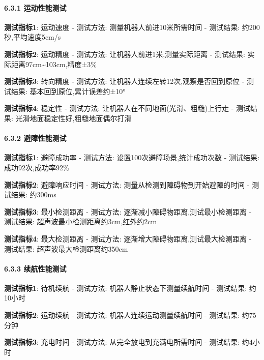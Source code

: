 \documentclass[
]{article}
\begin{document}
\hypertarget{ux8fd0ux52a8ux6027ux80fdux6d4bux8bd5}{%
\paragraph{6.3.1
运动性能测试}\label{ux8fd0ux52a8ux6027ux80fdux6d4bux8bd5}}

\textbf{测试指标1}: 运动速度 - 测试方法: 测量机器人前进10米所需时间 -
测试结果: 约200秒,平均速度5cm/s

\textbf{测试指标2}: 运动精度 - 测试方法: 让机器人前进1米,测量实际距离 -
测试结果: 实际距离97cm\textasciitilde103cm,精度±3\%

\textbf{测试指标3}: 转向精度 - 测试方法:
让机器人连续左转12次,观察是否回到原位 - 测试结果:
基本回到原位,累计误差约±10°

\textbf{测试指标4}: 稳定性 - 测试方法:
让机器人在不同地面(光滑、粗糙)上行走 - 测试结果:
光滑地面稳定性好,粗糙地面偶尔打滑

\hypertarget{ux907fux969cux6027ux80fdux6d4bux8bd5}{%
\paragraph{6.3.2
避障性能测试}\label{ux907fux969cux6027ux80fdux6d4bux8bd5}}

\textbf{测试指标1}: 避障成功率 - 测试方法:
设置100次避障场景,统计成功次数 - 测试结果: 成功92次,成功率92\%

\textbf{测试指标2}: 避障响应时间 - 测试方法:
测量从检测到障碍物到开始避障的时间 - 测试结果: 约300ms

\textbf{测试指标3}: 最小检测距离 - 测试方法:
逐渐减小障碍物距离,测试最小检测距离 - 测试结果:
超声波最小检测距离约3cm,红外约2cm

\textbf{测试指标4}: 最大检测距离 - 测试方法:
逐渐增大障碍物距离,测试最大检测距离 - 测试结果:
超声波最大检测距离约350cm

\hypertarget{ux7eedux822aux6027ux80fdux6d4bux8bd5}{%
\paragraph{6.3.3
续航性能测试}\label{ux7eedux822aux6027ux80fdux6d4bux8bd5}}

\textbf{测试指标1}: 待机续航 - 测试方法: 机器人静止状态下测量续航时间 -
测试结果: 约10小时

\textbf{测试指标2}: 运动续航 - 测试方法: 机器人连续运动测量续航时间 -
测试结果: 约75分钟

\textbf{测试指标3}: 充电时间 - 测试方法: 从完全放电到充满电所需时间 -
测试结果: 约4小时
\end{document}
